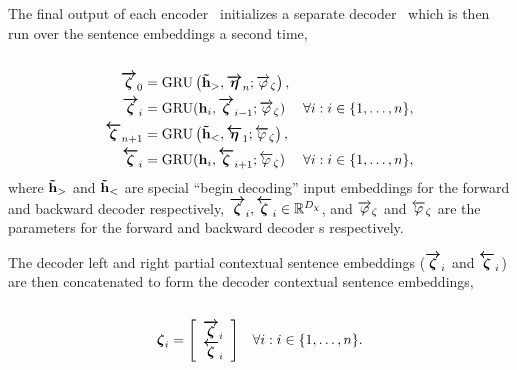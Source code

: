 The final output of each encoder \gru~initializes a separate decoder \gru~which
is then run over the sentence embeddings a second time, \\


\\[-40pt]
\begin{align}
\boldsymbol{\overrightarrow{\zeta}}_0 & = \operatorname{GRU}\left(\boldsymbol{\tilde{\mathbf{h}}}_>,   \boldsymbol{\overrightarrow{\eta}}_n; {\overrightarrow{\varphi}_\zeta}\right),\\ 
        \boldsymbol{\overrightarrow{\zeta}}_i & = \operatorname{GRU}(
            \mathbf{h}_i,  \boldsymbol{\overrightarrow{\zeta}}_{i-1}; 
            {\overrightarrow{\varphi}_\zeta}) &
    \forall i : i \in \{1,\ldots,n\}, \\
\boldsymbol{\overleftarrow{\zeta}}_{n+1} & = \operatorname{GRU}\left(\boldsymbol{\tilde{\mathbf{h}}}_<, \boldsymbol{\overleftarrow{\eta}}_1;{\overleftarrow{\varphi}_\zeta}\right),\\ 
        \boldsymbol{\overleftarrow{\zeta}}_i & = \operatorname{GRU}(
            \mathbf{h}_i,  \boldsymbol{\overleftarrow{\zeta}}_{i+1}; 
            {\overleftarrow{\varphi}_\zeta}) &
    \forall i : i \in \{1,\ldots,n\}, 
\end{align}
where $\boldsymbol{\tilde{\mathbf{h}}}_>$ and $\boldsymbol{\tilde{\mathbf{h}}}_<$ are special ``begin decoding'' input
embeddings for the forward and backward decoder respectively,
$\boldsymbol{\overrightarrow{\zeta}}_i, \boldsymbol{\overleftarrow{\zeta}}_i \in \mathbb{R}^{{D_\chi}}$, and
${\overrightarrow{\varphi}_\zeta}$ and ${\overleftarrow{\varphi}_\zeta}$ are the parameters for the forward
and backward decoder \gru s respectively.

The decoder left and right partial contextual sentence embeddings
($\boldsymbol{\overrightarrow{\zeta}}_i$ and $\boldsymbol{\overleftarrow{\zeta}}_i$) are then concatenated to form the
decoder contextual sentence embeddings,\\

\\[-20pt]
\begin{align}
        \boldsymbol{\zeta}_i & = \left[\begin{array}{c}
            \boldsymbol{\overrightarrow{\zeta}}_i\\ 
            \boldsymbol{\overleftarrow{\zeta}}_i\end{array}\right] &
    \forall i :  i \in \{1,\ldots,n\}.
\end{align}


